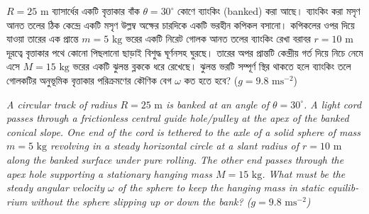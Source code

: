 \documentclass[12pt, a4paper]{article}
\begin{document}
\newpage

\begin{tcolorbox}[questionbox={প্রশ্ন (Question) 4}]
    \noindent
    $R = 25\text{ m}$ ব্যাসার্ধের একটি বৃত্তাকার বাঁক $\theta = 30^\circ$ কোণে ব্যাংকিং (banked) করা আছে। ব্যাংকিং করা মসৃণ আনত তলের ঠিক কেন্দ্রে একটি মসৃণ উল্লম্ব অক্ষের চারদিকে একটি ভরহীন কপিকল বসানো। কপিকলের ওপর দিয়ে যাওয়া তারের এক প্রান্তে $m = 5\text{ kg}$ ভরের একটি নিরেট গোলক আনত তলের ব্যাংকিং রেখা বরাবর $r = 10\text{ m}$ দূরত্বে বৃত্তাকার পথে কোনো পিছলানো ছাড়াই বিশুদ্ধ ঘূর্ণনসহ ঘুরছে। তারের অপর প্রান্তটি কেন্দ্রীয় গর্ত দিয়ে নিচে নেমে এসে $M = 15\text{ kg}$ ভরের একটি ঝুলন্ত ব্লককে ধরে রেখেছে। ঝুলন্ত ভরটি সম্পূর্ণ স্থির থাকতে হলে ব্যাংকিং তলে গোলকটির অনুভূমিক বৃত্তাকার পরিক্রমণের কৌণিক বেগ $\omega$ কত হতে হবে? ($g = 9.8\text{ ms}^{-2}$)
    
    \vspace{0.8em}
    \begin{english}
    \noindent\textit{\color{darkgray}
    A circular track of radius $R = 25\text{ m}$ is banked at an angle of $\theta = 30^\circ$. A light cord passes through a frictionless central guide hole/pulley at the apex of the banked conical slope. One end of the cord is tethered to the axle of a solid sphere of mass $m = 5\text{ kg}$ revolving in a steady horizontal circle at a slant radius of $r = 10\text{ m}$ along the banked surface under pure rolling. The other end passes through the apex hole supporting a stationary hanging mass $M = 15\text{ kg}$. What must be the steady angular velocity $\omega$ of the sphere to keep the hanging mass in static equilibrium without the sphere slipping up or down the bank? ($g = 9.8\text{ ms}^{-2}$)
    }
    \end{english}
\end{tcolorbox}
\end{document}
